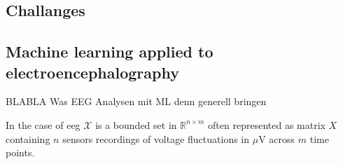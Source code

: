 \subsection{Challanges}


































\subsection{Machine learning applied to electroencephalography}
BLABLA Was EEG Analysen mit ML denn generell bringen 

In the case of \gls{eeg} $\mathcal{X}$ is a bounded set in $\mathbb{R}^{n\times m}$ often represented as matrix $X$ containing $n$ sensors recordings of voltage fluctuations in $\mu$V across $m$ time points. 


